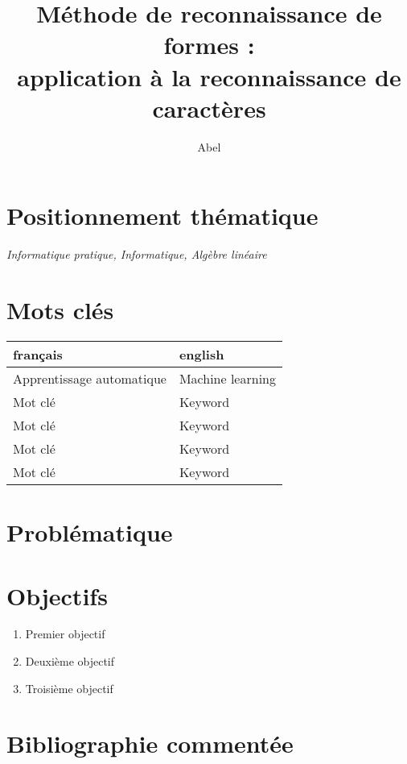 \documentclass[11pt]{article}
\title{\textbf{Méthode de reconnaissance de formes : \\application à la reconnaissance de caractères}}
\author{Abel \bsc{Calluaud}}
\date{\oldstylenums{2017}}
\begin{document}
\maketitle


\section{Positionnement thématique}
\textit{Informatique pratique, Informatique, Algèbre linéaire}

\section{Mots clés}
\begin{tabular}{ll}

\textbf{français} & \textbf{english}\\
\hline
Apprentissage automatique & Machine learning \\
Mot clé & Keyword \\
Mot clé & Keyword \\
Mot clé & Keyword \\
Mot clé & Keyword \\
\end{tabular}

\section{Problématique}

\section{Objectifs}
\begin{enumerate}
\item Premier objectif
\item Deuxième objectif
\item Troisième objectif
\end{enumerate}


\section{Bibliographie commentée}
\cite{likforman2013reconnaissance}




\end{document}
